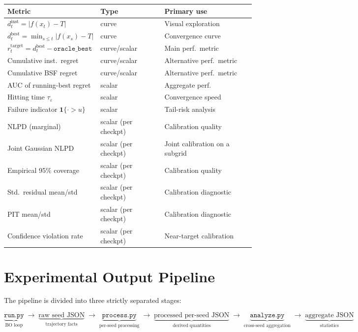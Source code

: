 \documentclass[11pt]{article}
\newcommand{\dinst}{d_t^{\mathrm{inst}}}
\newcommand{\dbest}{d_t^{\mathrm{best}}}
\newcommand{\rtarget}{r_t^{\mathrm{target}}}
\begin{document}
\begin{center}
\begin{tabular}{lll}
\toprule
Metric & Type & Primary use \\
\midrule
$\dinst = |f(x_t)-T|$ & curve & Visual exploration \\
$\dbest = \min_{s\le t}|f(x_s)-T|$ & curve & Convergence curve \\
$\rtarget = \dbest - \texttt{oracle\_best}$ & curve/scalar & Main perf.\ metric \\
Cumulative inst.\ regret & curve/scalar & Alternative perf.\ metric \\
Cumulative BSF regret & curve/scalar & Alternative perf.\ metric \\
AUC of running-best regret & scalar & Aggregate perf.\ \\
Hitting time $\tau_\varepsilon$ & scalar & Convergence speed \\
Failure indicator $\mathbf{1}\{\cdot > u\}$ & scalar & Tail-risk analysis \\
NLPD (marginal) & scalar (per checkpt) & Calibration quality \\
Joint Gaussian NLPD & scalar (per checkpt) & Joint calibration on a subgrid \\
Empirical 95\% coverage & scalar (per checkpt) & Calibration quality \\
Std.\ residual mean/std & scalar (per checkpt) & Calibration diagnostic \\
PIT mean/std & scalar (per checkpt) & Calibration diagnostic \\
Confidence violation rate & scalar (per checkpt) & Near-target calibration \\
\bottomrule
\end{tabular}
\end{center}
 
\section{Experimental Output Pipeline}
\label{sec:pipeline}
 
The pipeline is divided into three strictly separated stages:
 
\begin{stagebox}
\[
  \underbrace{\texttt{run.py}}_{\text{BO loop}}
  \;\longrightarrow\;
  \underbrace{\text{raw seed JSON}}_{\text{trajectory facts}}
  \;\longrightarrow\;
  \underbrace{\texttt{process.py}}_{\text{per-seed processing}}
  \;\longrightarrow\;
  \underbrace{\text{processed per-seed JSON}}_{\text{derived quantities}}
  \;\longrightarrow\;
  \underbrace{\texttt{analyze.py}}_{\text{cross-seed aggregation}}
  \;\longrightarrow\;
  \underbrace{\text{aggregate JSON}}_{\text{statistics}}
\]
\end{stagebox}
 
\end{document}
